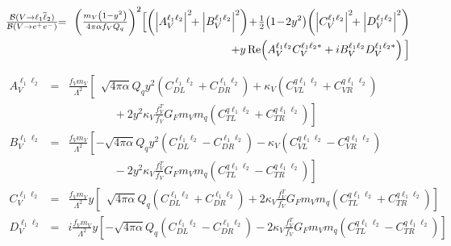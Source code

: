 \documentclass[12pt]{article}
\begin{document}
\begin{eqnarray}
\tfrac{{\cal B}(V \to \ell_1 \overline \ell_2)}{{\cal B}(V \to e^+e^-)} \! \! &=& \! \!
\left(\tfrac{m_V \left(1-y^2\right)}{4\pi\alpha  f_V Q_q}\right)^2 \! \Big[ \! \left(\left|A_V^{\ell_1\ell_2}\right|^2 \! \! +  
\left|B_V^{\ell_1\ell_2}\right|^2\right) \! + \! \tfrac{1}{2} \! \left(1 \! - \! 2y^2\right) \!  
\left(\left|C_V^{\ell_1\ell_2}\right|^2 \! \! + \left|D_V^{\ell_1\ell_2}\right|^2\right)  \nonumber \\
&& + y \, \text{Re} \! \left(A_V^{\ell_1\ell_2} C_V^{\ell_1\ell_2 *}+i B_V^{\ell_1\ell_2} D_V^{\ell_1\ell_2 *}\right) 
\Big] \label{eqn:VecBR}
\end{eqnarray}

\begin{eqnarray}
\! \! \! \! \! \! \! \! \! \! A_V^{\ell_1\ell_2} \! \! \! \! &=&\! \! \tfrac{f_V m_V}{\Lambda^2} \! \left[ \ \
\sqrt{4\pi \alpha} Q_{q}  y^2 (C_{DL}^{\ell_1\ell_2}+C_{DR}^{\ell_1\ell_2}) + 
\kappa_V (C_{VL}^{q \ell_1\ell_2} + C_{VR}^{q \ell_1\ell_2}) \right. \label{eqn:VCoefA} \\
&& \qquad\qquad + \left. 2 y^2 \kappa_V \frac{f^T_V}{f_V} G_F m_V m_{q}   
(C_{TL}^{q \ell_1\ell_2} + C_{TR}^{q \ell_1\ell_2})
 \right]
\nonumber \\
\! \! \! \! \! \! \! \! \! \! B_V^{\ell_1\ell_2} \! \! \! \! &=& \! \! \tfrac{f_V m_V}{\Lambda^2} \! \left[
- \sqrt{4\pi \alpha} Q_{q}   y^2 (C_{DL}^{\ell_1\ell_2}-C_{DR}^{\ell_1\ell_2}) - 
\kappa_V (C_{VL}^{q \ell_1\ell_2} - C_{VR}^{q \ell_1\ell_2}) \right.  \label{eqn:VCoefB} \\
&& \qquad\qquad - \left. 2 y^2 \kappa_V \frac{f^T_V}{f_V} G_F m_V m_{q}   
(C_{TL}^{q \ell_1\ell_2} -C_{TR}^{q \ell_1\ell_2})
 \right] \nonumber \\
\! \! \! \! \! \! \! \! \! \! C_V^{\ell_1\ell_2} \! \! \! \! &=& \! \! \tfrac{ f_V m_V}{\Lambda^2} y \left[ \ \ \sqrt{4\pi \alpha} Q_{q} 
(C_{DL}^{\ell_1\ell_2} + C_{DR}^{\ell_1\ell_2}) + 
2 \kappa_V \tfrac{f^T_V}{f_V}
G_F m_V m_{q} (C_{TL}^{q \ell_1\ell_2} + C_{TR}^{q \ell_1\ell_2}) \right] 
\label{eqn:VCoefC} \\
\! \! \! \! \! \! \! \! \! \! D_V^{\ell_1\ell_2} \! \! \! \! &=& \! \! \! \! i \tfrac{ f_V m_V}{\Lambda^2} y \left[ -\sqrt{4\pi \alpha} Q_{q} 
(C_{DL}^{\ell_1\ell_2} - C_{DR}^{\ell_1\ell_2}) -
2 \kappa_V \tfrac{f^T_V}{f_V}
G_F m_V m_{q}  (C_{TL}^{q \ell_1\ell_2} - C_{TR}^{q \ell_1\ell_2}) \right] 
\label{eqn:VCoefD}
\end{eqnarray}
\end{document}
